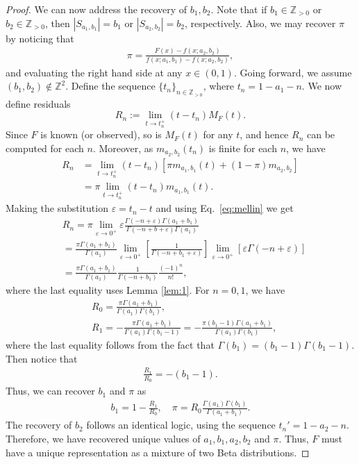 \documentclass[10pt,a4paper]{amsart}
\begin{document}
\begin{proof}
We can now address the recovery of $b_1,b_2$. Note that if $b_1 \in\mathbb{Z}_{>0}$ or $b_2 \in \mathbb{Z}_{>0}$, then $|S_{a_1,b_1}| = b_1$ or $|S_{a_2,b_2}| = b_2$, respectively. Also, we may recover $\pi$ by noticing that
\begin{align*}
    \pi = \frac{F(x)-f(x;a_2,b_2)}{f(x;a_1,b_1)-f(x;a_2,b_2)},
\end{align*}
and evaluating the right hand side at any $x \in (0,1)$. Going forward, we assume $(b_1,b_2) \notin \mathbb{Z}^2$. Define the sequence $\{t_n\}_{n\in\mathbb{Z}_{>0}}$, where $t_n = 1-a_1-n$. We now define residuals
$$R_n :=\lim\limits_{t \to t_n^+} (t-t_n)M_F(t).$$
Since $F$ is known (or observed), so is $M_F(t)$ for any $t$, and hence $R_n$ can be computed for each $n$. Moreover, as $m_{a_2,b_2}(t_n)$ is finite for each $n$, we have
\begin{align*}
    R_n &= \lim\limits_{t \to t_n^+} (t-t_n)[\pi m_{a_1,b_1}(t)+(1-\pi)m_{a_2,b_2}]\\
    &= \pi\lim\limits_{t \to t_n^+} (t-t_n)m_{a_1,b_1}(t).
\end{align*}
Making the substitution $\varepsilon = t_n-t$ and using Eq.~\ref{eq:mellin} we get
\begin{align*}
    &R_n = \pi \lim\limits_{\varepsilon \to 0^+} \varepsilon\frac{\Gamma(-n+\varepsilon)\Gamma(a_1+b_1)}{\Gamma(-n+b+\varepsilon)\Gamma(a_1)}\\
    &= \frac{\pi \Gamma(a_1+b_1)}{\Gamma(a_1)}\lim\limits_{\varepsilon \to 0^+} \left[\frac{1}{\Gamma(-n+b_1+\varepsilon)}\right] \lim\limits_{\varepsilon\to 0^+} \left[\varepsilon \Gamma(-n+\varepsilon)\right]  \\
    &=\frac{\pi \Gamma(a_1+b_1)}{\Gamma(a_1)} \frac{1}{\Gamma(-n+b_1)} \frac{(-1)^n}{n!},
\end{align*}
where the last equality uses Lemma \ref{lem:1}. For $n=0,1$, we have
\begin{align*}
    &R_0 = \frac{\pi\Gamma(a_1+b_1)}{\Gamma(a_1)\Gamma(b_1)},\\
    &R_1 = -\frac{\pi \Gamma(a_1+b_1)}{\Gamma(a_1)\Gamma(b_1-1)} = -\frac{\pi(b_1-1)\Gamma(a_1+b_1)}{\Gamma(a_1)\Gamma(b_1)},
\end{align*}
where the last equality follows from the fact that $\Gamma(b_1)=(b_1-1)\Gamma(b_1-1)$. Then notice that
\begin{align*}
    \frac{R_1}{R_0}  = -(b_1-1).
\end{align*}
Thus, we can recover $b_1$ and $\pi$ as
\begin{align*}
    b_1 = 1-\frac{R_1}{R_0}, \quad \pi = R_0 \frac{\Gamma(a_1)\Gamma(b_1)}{\Gamma(a_1+b_1)}.
\end{align*}
The recovery of $b_2$ follows an identical logic, using the sequence $t_n'=1-a_2-n$. Therefore, we have recovered unique values of $a_1,b_1,a_2,b_2$ and $\pi$. Thus, $F$ must have a unique representation as a mixture of two Beta distributions.
\end{proof}
\end{document}
